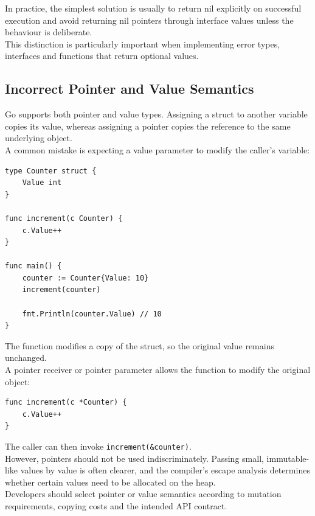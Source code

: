 In practice, the simplest solution is usually to return nil explicitly on successful execution and avoid returning nil pointers through interface values unless the behaviour is deliberate.\\

This distinction is particularly important when implementing error types, interfaces and functions that return optional values.\\

\subsection{Incorrect Pointer and Value Semantics}

Go supports both pointer and value types. Assigning a struct to another variable copies its value, whereas assigning a pointer copies the reference to the same underlying object.\\

A common mistake is expecting a value parameter to modify the caller's variable:

\begin{lstlisting}
type Counter struct {
    Value int
}

func increment(c Counter) {
    c.Value++
}

func main() {
    counter := Counter{Value: 10}
    increment(counter)

    fmt.Println(counter.Value) // 10
}
\end{lstlisting}

The function modifies a copy of the struct, so the original value remains unchanged.\\

A pointer receiver or pointer parameter allows the function to modify the original object:

\begin{lstlisting}
func increment(c *Counter) {
    c.Value++
}
\end{lstlisting}

The caller can then invoke \texttt{increment(\&counter)}.\\

However, pointers should not be used indiscriminately. Passing small, immutable-like values by value is often clearer, and the compiler's escape analysis determines whether certain values need to be allocated on the heap.\\

Developers should select pointer or value semantics according to mutation requirements, copying costs and the intended API contract.\\

